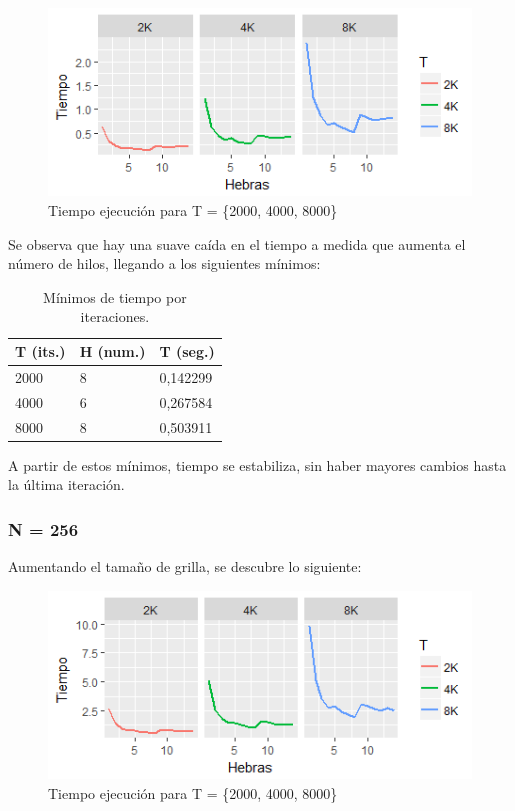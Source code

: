 \documentclass[jou]{apa6}
\begin{document}
\begin{figure}[h]
	\includegraphics[width=\columnwidth]{tiempo-128px.png}
	\caption{Tiempo ejecución para T = \{2000, 4000, 8000\}}
	\label{fig:Figure1}
\end{figure}

Se observa que hay una suave caída en el tiempo a medida que aumenta el número de hilos, llegando a los siguientes mínimos: 

\begin{table}[h]
\centering
\caption{Mínimos de tiempo por iteraciones.}
\label{my-label}
\begin{tabular}{@{}lll@{}}
\toprule
\multicolumn{1}{c}{T (its.)} & \multicolumn{1}{c}{H (num.)} & \multicolumn{1}{c}{T (seg.)} \\ \midrule
2000                         & 8                            & 0,142299                     \\
4000                         & 6                            & 0,267584                     \\
8000                         & 8                            & 0,503911                     \\ \bottomrule
\end{tabular}
\end{table}

A partir de estos mínimos, tiempo se estabiliza, sin haber mayores cambios hasta la última iteración.

\subsubsection{N = 256}
Aumentando el tamaño de grilla, se descubre lo siguiente:

\begin{figure}[h]
	\includegraphics[width=\columnwidth]{tiempo-256px.png}
	\caption{Tiempo ejecución para T = \{2000, 4000, 8000\}}
	\label{fig:Figure2}
\end{figure}
\end{document}

